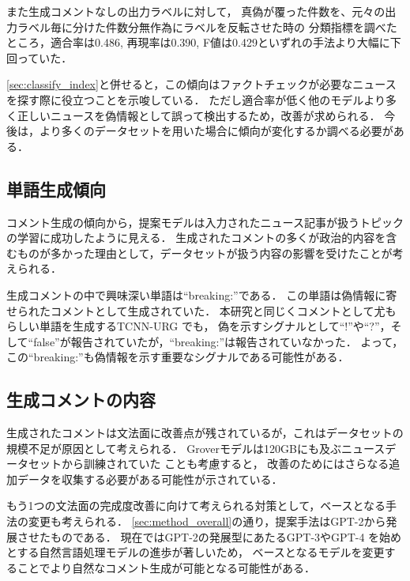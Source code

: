 また生成コメントなしの出力ラベルに対して，
真偽が覆った件数を、元々の出力ラベル毎に分けた件数分無作為にラベルを反転させた時の
分類指標を調べたところ，適合率は0.486, 再現率は0.390, F値は0.429といずれの手法より大幅に下回っていた．

\cref{sec:classify_index}と併せると，この傾向はファクトチェックが必要なニュースを探す際に役立つことを示唆している．
ただし適合率が低く他のモデルより多く正しいニュースを偽情報として誤って検出するため，改善が求められる．
今後は，より多くのデータセットを用いた場合に傾向が変化するか調べる必要がある．

\subsection{単語生成傾向}
コメント生成の傾向から，提案モデルは入力されたニュース記事が扱うトピックの学習に成功したように見える．
生成されたコメントの多くが政治的内容を含むものが多かった理由として，データセットが扱う内容の影響を受けたことが考えられる．

生成コメントの中で興味深い単語は``breaking:''である．
この単語は偽情報に寄せられたコメントとして生成されていた．
本研究と同じくコメントとして尤もらしい単語を生成するTCNN-URG \cite{ijcai2018-533}でも，
偽を示すシグナルとして``!''や``?''，そして``false''が報告されていたが，``breaking:''は報告されていなかった．
よって，この``breaking:''も偽情報を示す重要なシグナルである可能性がある．

\subsection{生成コメントの内容}
生成されたコメントは文法面に改善点が残されているが，これはデータセットの規模不足が原因として考えられる．
Groverモデルは120GBにも及ぶニュースデータセットから訓練されていた \cite{DBLP:journals/corr/abs-1905-12616}ことも考慮すると，
改善のためにはさらなる追加データを収集する必要がある可能性が示されている．

もう1つの文法面の完成度改善に向けて考えられる対策として，ベースとなる手法の変更も考えられる．
\cref{sec:method_overall}の通り，提案手法はGPT-2から発展させたものである．
現在ではGPT-2の発展型にあたるGPT-3\cite{brown2020language}やGPT-4 \cite{openai2023gpt4}を始めとする自然言語処理モデルの進歩が著しいため，
ベースとなるモデルを変更することでより自然なコメント生成が可能となる可能性がある．
